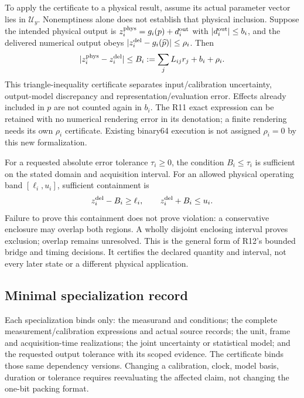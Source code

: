 To apply the certificate to a physical result, assume its actual parameter
vector lies in $\mathcal U_y$. Nonemptiness alone does not establish that
physical inclusion. Suppose the intended physical output is
$z_i^{\rm phys}=g_i(p)+d_i^{\rm out}$ with
$|d_i^{\rm out}|\leq b_i$, and the delivered numerical output obeys
$|z_i^{\rm del}-g_i(\widehat p)|\leq\rho_i$. Then
\begin{equation}
 |z_i^{\rm phys}-z_i^{\rm del}|\leq
 B_i:=\sum_jL_{ij}r_j+b_i+\rho_i.
 \label{r13-measurement-total-bound}
\end{equation}
This triangle-inequality certificate separates input/calibration uncertainty,
output-model discrepancy and representation/evaluation error. Effects already
included in $p$ are not counted again in $b_i$. The R11 exact expression can
be retained with no numerical rendering error in its denotation; a finite
rendering needs its own $\rho_i$ certificate. Existing binary64 execution is
not assigned $\rho_i=0$ by this new formalization.

For a requested absolute error tolerance $\tau_i\geq0$, the condition
$B_i\leq\tau_i$ is sufficient on the stated domain and acquisition interval.
For an allowed physical operating band $[\ell_i,u_i]$, sufficient containment is
\begin{equation}
 z_i^{\rm del}-B_i\geq\ell_i,\qquad
 z_i^{\rm del}+B_i\leq u_i.
 \label{r13-measurement-tolerance}
\end{equation}
Failure to prove this containment does not prove violation: a conservative
enclosure may overlap both regions. A wholly disjoint enclosing interval
proves exclusion; overlap remains unresolved. This is the general form of
R12's bounded bridge and timing decisions. It certifies the declared quantity
and interval, not every later state or a different physical application.

\subsection{Minimal specialization record}
\label{r13-measurement-record}

Each specialization binds only: the measurand and conditions; the complete
measurement/calibration expressions and actual source records; the unit,
frame and acquisition-time realizations; the joint uncertainty or statistical
model; and the requested output tolerance with its scoped evidence. The
certificate binds those same dependency versions. Changing a calibration,
clock, model basis, duration or tolerance requires reevaluating the affected
claim, not changing the one-bit packing format.

